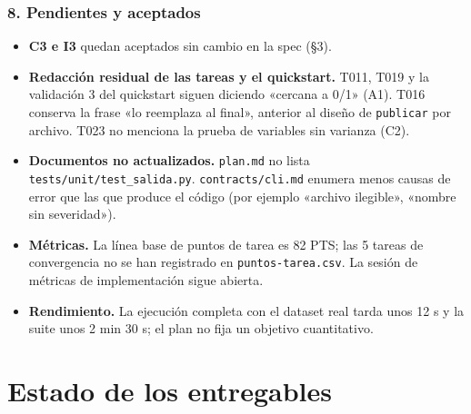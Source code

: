 \documentclass[12pt,a4paper]{article}
\providecommand{\tightlist}{\setlength{\itemsep}{0pt}\setlength{\parskip}{0pt}}
\newenvironment{documentogenerado}[2]{%
  \def\doccomando{#1}\def\docruta{#2}%
  \par\begingroup\small\setstretch{1.15}\sloppy%
}{\endgroup\par\medskip}
\begin{document}
\begin{documentogenerado}{/speckit-analyze + /speckit-converge}{specs\slash 001-preparacion-datos\slash auditoria.md}
\subsubsection{8. Pendientes y aceptados}

\begin{itemize}
\tightlist
\item
  \textbf{C3 e I3} quedan aceptados sin cambio en la spec (§3).
\item
  \textbf{Redacción residual de las tareas y el quickstart.} T011, T019 y la validación 3 del quickstart siguen diciendo «cercana a 0/\hspace{0pt}1» (A1). T016 conserva la frase «lo reemplaza al final», anterior al diseño de \texttt{publicar} por archivo. T023 no menciona la prueba de variables sin varianza (C2).
\item
  \textbf{Documentos no actualizados.} \texttt{plan.\allowbreak{}md} no lista \texttt{tests/\allowbreak{}unit/\allowbreak{}test\_\allowbreak{}salida.\allowbreak{}py}. \texttt{contracts/\allowbreak{}cli.\allowbreak{}md} enumera menos causas de error que las que produce el código (por ejemplo «archivo ilegible», «nombre sin severidad»).
\item
  \textbf{Métricas.} La línea base de puntos de tarea es 82 PTS; las 5 tareas de convergencia no se han registrado en \texttt{puntos-\allowbreak{}tarea.\allowbreak{}csv}. La sesión de métricas de implementación sigue abierta.
\item
  \textbf{Rendimiento.} La ejecución completa con el dataset real tarda unos 12 s y la suite unos 2 min 30 s; el plan no fija un objetivo cuantitativo.
\end{itemize}
\end{documentogenerado}

\newpage
\section{Estado de los entregables}
\end{document}
